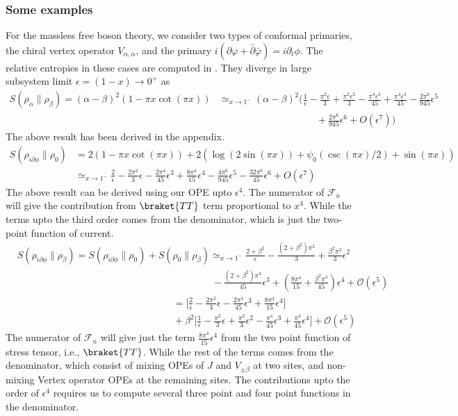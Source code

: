 \documentclass[11pt]{article}
\newcommand{\ep}{\epsilon}
\newcommand{\p}{\partial}
\newcommand{\mO}{\mathcal{O}}
\newcommand{\nn}{\nonumber}
\newcommand{\lb}{\left(}
\newcommand{\rb}{\right)}
\begin{document}
\subsubsection{Some examples}

For the massless free boson theory, we consider two types of conformal primaries, the chiral vertex operator $V_{\alpha,\alpha}$, and the primary $i(\p\varphi+\bar{\p}\bar{\varphi})=i\p_t\phi$. The relative entropies in these cases are computed in \cite{Ruggiero_2017}. They diverge in large subsystem limit $\ep=(1-x)\to 0^+$ as
\begin{align}\label{eq: free massless boson result large x limit}
S(\rho_\alpha\|\rho_\beta)=(\alpha-\beta)^2 (1-\pi x \cot(\pi x))&\simeq_{x\to 1^-} (\alpha-\beta)^2\Bigg( \frac{1}{\ep}-\frac{\pi^2\ep}{3}+\frac{\pi^2\ep^2}{3}-\frac{\pi^4\ep^3}{45}+\frac{\pi^4\ep^4}{45}-\frac{2\pi^6}{945}\ep^5
\nn\\&\qquad\qquad\qquad\qquad\qquad+ \frac{2\pi^6}{945}\ep^6 + O(\ep^7)\Bigg)
\end{align}
The above result has been derived in the appendix.
\begin{align}
S(\rho_{i\partial\phi}\|\rho_0)&=2(1-\pi x \cot(\pi x))+2\lb \log(2\sin(\pi x))+\psi_0(\csc(\pi x)/2)+\sin(\pi x)\rb\\
&\simeq_{x\to 1^-} \frac{2}{\ep}-\frac{2\pi^2}{3}\ep- \frac{2\pi^4}{45}\ep^3 + \frac{8\pi^4}{15}\ep^4 -\frac{4\pi^6}{945}\ep^5 -\frac{32\pi^6}{45}\ep^6 + O(\ep^7)
\end{align}
The above result can be derived using our OPE upto $\ep^4$.  The numerator of $\mathcal{F}_n$ will give the contribution from $\braket{TT}$ term proportional to $x^4$. While the terms upto the third order comes from the denominator, which is just the two-point function of current. 
\begin{align}
&S(\rho_{i\partial\phi}\|\rho_\beta)=S(\rho_{i\partial\phi}\|\rho_0)+S(\rho_0\|\rho_\beta)\simeq_{x\to 1^-}\frac{2+\beta^2}{\ep} - \frac{(2+\beta^2)\pi^2}{3} + \frac{\beta^2 \pi^2}{3}\ep^2 \nn \\
&\qquad \qquad \qquad \qquad \qquad \qquad \qquad \qquad \qquad \qquad- \frac{(2+\beta^2)\pi^4}{45}\ep^3 + \lb \frac{8\pi^4}{15} + \frac{\beta^2\pi^4}{45}\rb\ep^4 + \mO(\ep^5) \\
&\qquad \qquad \qquad \qquad \qquad \qquad \qquad \qquad = \Bigg[\frac{2}{\ep} - \frac{2\pi^2}{3}\ep - \frac{2\pi^4}{45}\ep^3 + \frac{8\pi^4}{15}\ep^4\Bigg]\nn \\
&\qquad \qquad \qquad \qquad \qquad \qquad \qquad \qquad
+ \beta^2 \Bigg[\frac{1}{\ep} - \frac{\pi^2}{3}\ep + \frac{\pi^2}{3}\ep^2 - \frac{\pi^4}{45}\ep^3 + \frac{\pi^4}{45}\ep^4\Bigg] + \mO(\ep^5)
\end{align}
The numerator of $\mathcal{F}_n$ will give just the term $\frac{8\pi^4}{15}\ep^4$ from the two point function of stress tensor, i.e., $\braket{TT}$. While the rest of the terms comes from the denominator, which consist of mixing OPEs of $J$ and $V_{\pm \beta}$ at two sites, and non-mixing Vertex operator OPEs at the remaining sites. The contributions upto the order of $\ep^4$ requires us to compute several three point and four point functions in the denominator. 
\end{document}
